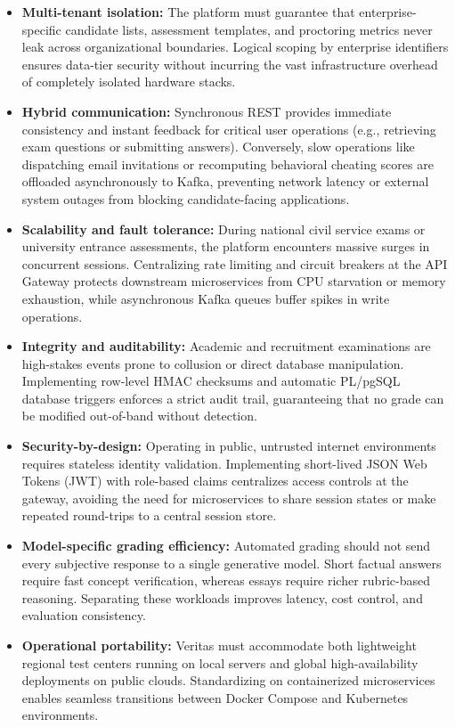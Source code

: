 \begin{itemize}
    \item \textbf{Multi-tenant isolation:} The platform must guarantee that enterprise-specific candidate lists, assessment templates, and proctoring metrics never leak across organizational boundaries. Logical scoping by enterprise identifiers ensures data-tier security without incurring the vast infrastructure overhead of completely isolated hardware stacks.
    \item \textbf{Hybrid communication:} Synchronous REST provides immediate consistency and instant feedback for critical user operations (e.g., retrieving exam questions or submitting answers). Conversely, slow operations like dispatching email invitations or recomputing behavioral cheating scores are offloaded asynchronously to Kafka, preventing network latency or external system outages from blocking candidate-facing applications.
    \item \textbf{Scalability and fault tolerance:} During national civil service exams or university entrance assessments, the platform encounters massive surges in concurrent sessions. Centralizing rate limiting and circuit breakers at the API Gateway protects downstream microservices from CPU starvation or memory exhaustion, while asynchronous Kafka queues buffer spikes in write operations.
    \item \textbf{Integrity and auditability:} Academic and recruitment examinations are high-stakes events prone to collusion or direct database manipulation. Implementing row-level HMAC checksums and automatic PL/pgSQL database triggers enforces a strict audit trail, guaranteeing that no grade can be modified out-of-band without detection.
    \item \textbf{Security-by-design:} Operating in public, untrusted internet environments requires stateless identity validation. Implementing short-lived JSON Web Tokens (JWT) with role-based claims centralizes access controls at the gateway, avoiding the need for microservices to share session states or make repeated round-trips to a central session store.
    \item \textbf{Model-specific grading efficiency:} Automated grading should not send every subjective response to a single generative model. Short factual answers require fast concept verification, whereas essays require richer rubric-based reasoning. Separating these workloads improves latency, cost control, and evaluation consistency.
    \item \textbf{Operational portability:} Veritas must accommodate both lightweight regional test centers running on local servers and global high-availability deployments on public clouds. Standardizing on containerized microservices enables seamless transitions between Docker Compose and Kubernetes environments.
\end{itemize}

